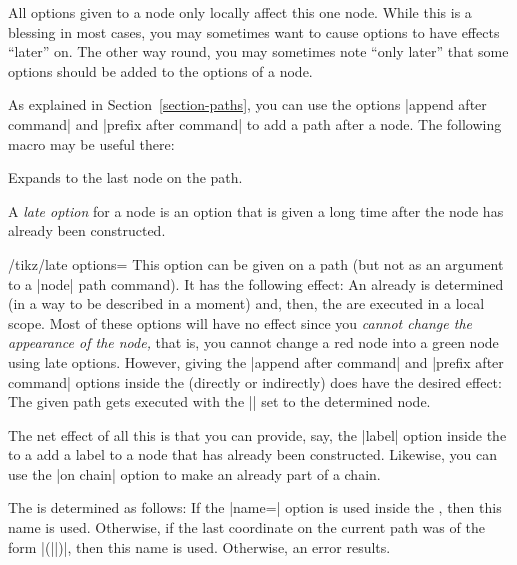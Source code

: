 All options given to a node only locally affect this one node. While
this is a blessing in most cases, you may sometimes want to cause
options to have effects ``later'' on. The other way round, you may
sometimes note ``only later'' that some options should be added to the
options of a node.

As explained in Section~\ref{section-paths}, you
can use the options |append after command| and
|prefix after command| to add a path after a node. The following macro may be
useful there:
\begin{command}{\tikzlastnode}
  Expands to the last node on the path.
\end{command}

A \emph{late option} for a node is an option that is given a long time
after the node has already been constructed.

\begin{key}{/tikz/late options=}
  This option can be given on a path (but not as an argument to a
  |node| path command). It has the following effect: An already
   is determined (in a way to be described in a moment)
  and, then, the  are executed in a local scope. Most of
  these options will have no effect since you \emph{cannot change the
    appearance of the node,} that is, you cannot change a red node
  into a green node using late options. However, giving 
  the |append after command| and |prefix after command| options inside
  the  (directly or indirectly) does have the desired
  effect: The given path gets executed with the |\tikzlastnode|
  set to the determined node.

  The net effect of all this is that you can provide, say, the |label|
  option inside the  to a add a label to a node that has
  already been constructed. Likewise, you can use the |on chain|
  option to make an already  part of a chain.

  The  is determined as follows: If the
  |name=| option is used inside the
  , then this name is used. Otherwise, if the last
  coordinate on the current path was of the form |(||)|, then this  name is used. Otherwise,
  an error results.

\begin{codeexample}[]
\end{codeexample}

\end{key}


